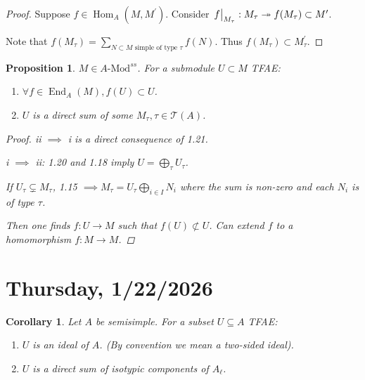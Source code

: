 \documentclass{article}
\theoremstyle{definition}
\theoremstyle{plain}
\newtheorem{proposition}[theorem]{Proposition}
\newtheorem{corollary}[theorem]{Corollary}
\theoremstyle{remark}
\begin{document}
    \begin{proof}
        Suppose \(f\in \operatorname{Hom}_A(M, M^{\prime})\). Consider \(\eval{f}_{M_{\tau}}: M_{\tau} \twoheadrightarrow f(M_{\tau}) \subset M^{\prime}\).
        
        Note that \(f(M_{\tau}) = \sum_{N \subset M \text{ simple of type } \tau} f(N)\). Thus \(f(M_{\tau}) \subset M^{\prime}_{\tau}\).  
    \end{proof}

    \begin{proposition}
        \(M \in A \text{-Mod}^{ss}\). For a submodule \(U \subset M\) TFAE:

        \begin{enumerate}[label=\roman*)]
            \item \(\forall f\in \operatorname{End}_A(M), f(U) \subset U\).
            \item \(U\) is a direct sum of some \(M_{\tau}, \tau \in \mathcal{T}(A)\).  
        \end{enumerate}
        
        \begin{proof}
            ii \(\implies\) i is a direct consequence of 1.21.

            i \(\implies\) ii: 1.20 and 1.18 imply \(U = \bigoplus_{\tau} U_{\tau}\).

            If \(U_{\tau} \subsetneq M_{\tau}\), 1.15 \(\implies M_{\tau} = U_{\tau} \bigoplus_{i\in I} N_i\) where the sum is non-zero and each \(N_i\) is of type \(\tau\).

            Then one finds \(f: U \to M\) such that \(f(U) \not\subset U\). Can extend \(f\) to a homomorphism \(f: M \to M\). 
        \end{proof}
    \end{proposition}

    \section*{Thursday, 1/22/2026}
    
    \begin{corollary}
        Let \(A\) be semisimple. For a subset \(U \subseteq A\) TFAE:

        \begin{enumerate}[label=\roman*)]
            \item \(U\) is an ideal of \(A\). (By convention we mean a two-sided ideal). 
            \item \(U\) is a direct sum of isotypic components of \(A_\ell\).
        \end{enumerate} 
    \end{corollary}
\end{document}
